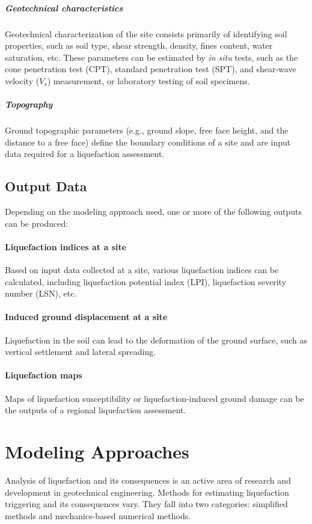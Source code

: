 \subparagraph{Geotechnical characteristics}
Geotechnical characterization of the site consists primarily of identifying soil properties, such as soil type, shear strength, density, fines content, water saturation, etc. These parameters can be estimated by \textit{in situ} tests, such as the cone penetration test (CPT), standard penetration test (SPT), and shear-wave velocity (${V_s}$) measurement, or laboratory testing of soil specimens.

\subparagraph{Topography}
Ground topographic parameters (e.g., ground slope, free face height, and the distance to a free face) define the boundary conditions of a site and are input data required for a liquefaction assessment. 


\subsection{Output Data}
\label{subsec:eq_liquefaction_output}
Depending on the modeling approach used, one or more of the following outputs can be produced:

\paragraph{Liquefaction indices at a site}
Based on input data collected at a site, various liquefaction indices can be calculated, including liquefaction potential index (LPI), liquefaction severity number (LSN), etc.

\paragraph{Induced ground displacement at a site}
Liquefaction in the soil can lead to the deformation of the ground surface, such as vertical settlement and lateral spreading.

\paragraph{Liquefaction maps}
Maps of liquefaction susceptibility or liquefaction-induced ground damage can be the outputs of a regional liquefaction assessment. 

\section{Modeling Approaches}
\label{sec:eq_liq_methods}

Analysis of liquefaction and its consequences is an active area of research and development in geotechnical engineering. Methods for estimating liquefaction triggering and its consequences vary. They fall into two categories: simplified methods and mechanics-based numerical methods.

